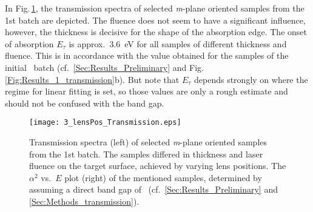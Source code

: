 In Fig.\,\ref{Fig:Results_3_lensTransmission}, the transmission spectra of selected \textit{m}-plane oriented samples from the 1st batch are depicted.
The fluence does not seem to have a significant influence, however, the thickness is decisive for the shape of the absorption edge.
The onset of absorption $E_\tau$ is approx.\ \qty{3.6}{\eV} for all samples of different thickness and fluence.
This is in accordance with the value obtained for the samples of the initial \cro\ batch (cf.~\ref{Sec:Results_Preliminary} and Fig.\,\ref{Fig:Results_1_transmission}b).
But note that $E_\tau$ depends strongly on where the regime for linear fitting is set, so those values are only a rough estimate and should not be confused with the band gap.

\begin{figure}
    \centering
    \texttt{[image: 3\_lensPos\_Transmission.eps]}
    \caption{
        Transmission spectra (left) of selected \textit{m}-plane oriented samples from the 1st batch.
        The samples differed in thickness and laser fluence on the target surface, achieved by varying lens positions.
        The $\alpha^2$ vs.\ $E$ plot (right) of the mentioned samples, determined by assuming a direct band gap of \cro\ (cf.~\ref{Sec:Results_Preliminary} and \ref{Sec:Methods_transmission}).
    }
    \label{Fig:Results_3_lensTransmission}
\end{figure}